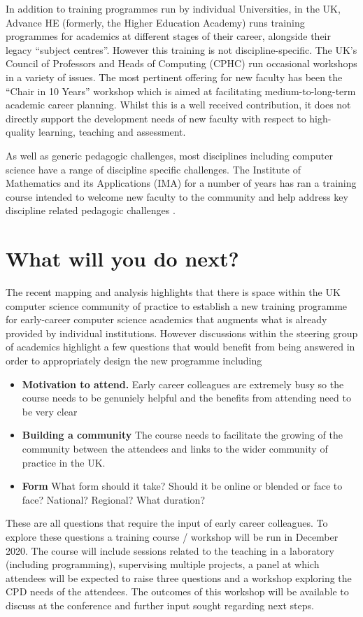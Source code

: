 \documentclass[sigconf]{acmart}
\begin{document}
In addition to training programmes run by individual Universities, in the UK, Advance HE (formerly, the Higher Education Academy) runs training programmes for academics at different stages of their career, alongside their legacy ``subject centres''. However this training is not discipline-specific. The UK's Council of Professors and Heads of Computing (CPHC) run occasional workshops in a variety of issues. The most pertinent offering for new faculty has been the ``Chair in 10 Years'' workshop which is aimed at facilitating medium-to-long-term academic career planning. Whilst this is a well received contribution, it does not directly support the development needs of new faculty with respect to high-quality learning, teaching and assessment.

As well as generic pedagogic challenges, most disciplines including computer science have a range of discipline specific challenges. The Institute of Mathematics and its Applications (IMA) for a number of years has ran a training course intended to welcome new faculty to the community and help address key discipline related pedagogic challenges \cite{IMA}.


\section{What will you do next?}

The recent mapping and analysis highlights that there is space within the UK computer science community of practice to establish a new training programme for early-career computer science academics that augments what is already provided by individual institutions. However discussions within the steering group of academics highlight a few questions that would benefit from being answered in order to appropriately design the new programme including
\begin{itemize}
	\item \textbf{Motivation to attend.} Early career colleagues are extremely busy so the course needs to be genuniely helpful and the benefits from attending need to be very clear
	\item \textbf{Building a community} The course needs to facilitate the growing of the community between the attendees and links to the wider community of practice in the UK.
	\item \textbf{Form} What form should it take? Should it be online or blended or face to face? National? Regional? What duration?
\end{itemize}
These are all questions that require the input of early career colleagues. To explore these questions a training course / workshop will be run in December 2020. The course will include sessions related to the teaching in a laboratory (including programming), supervising multiple projects, a panel at which attendees will be expected to raise three questions and a workshop exploring the CPD needs of the attendees. The outcomes of this workshop will be available to discuss at the conference and further input sought regarding next steps.
\end{document}
